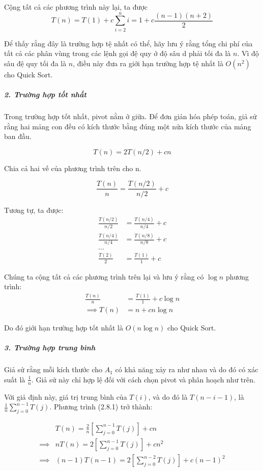 Cộng tất cả các phương trình này lại, ta được 
$$T(n) = T(1) + c \sum_{i = 2}^{n}i = 1 + c \frac{(n - 1)(n + 2)}{2}$$

Để thấy rằng đây là trường hợp tệ nhất có thể, hãy lưu ý rằng tổng chi phí của tất cả các phân vùng trong các lệnh gọi đệ quy ở độ sâu d phải tối đa là $n$. Vì độ sâu đệ quy tối đa là $n$, điều này đưa ra giới hạn trường hợp tệ nhất là $O(n^2)$ cho Quick Sort.

\subparagraph{2. Trường hợp tốt nhất}

Trong trường hợp tốt nhất, pivot nằm ở giữa. Để đơn giản hóa phép toán, giả sử rằng hai mảng con đều có kích thước bằng đúng một nửa kích thước của mảng ban đầu.

$$T(n) = 2T(n / 2) + cn$$

Chia cả hai vế của phương trình trên cho n. 

$$\frac{T(n)}{n} = \frac{T(n / 2)}{n / 2} + c$$

Tương tự, ta được:
\begin{align*}
    \frac{T(n/2)}{n/2} &= \frac{T(n / 4)}{n / 4} + c \\
    \frac{T(n/4)}{n/4} &= \frac{T(n / 8)}{n / 8} + c \\
    \dots \\
    \frac{T(2)}{2} &= \frac{T(1)}{1} + c
\end{align*}

Chúng ta cộng tất cả các phương trình trên lại và lưu ý rằng có $\log{n}$ phương trình:
\begin{align*}
    \frac{T(n)}{n} &= \frac{T(1)}{1} + c \log{n} \\
    \implies T(n) &= n + cn\log{n} 
\end{align*}

Do đó giới hạn trường hợp tốt nhất là $O(n\log{n})$ cho Quick Sort.

\subparagraph{3. Trường hợp trung bình}

Giả sử rằng mỗi kích thước cho $A_1$ có khả năng xảy ra như nhau và do đó có xác suất là $\frac{1}{n}$. Giả sử này chỉ hợp lệ đối với cách chọn pivot và phân hoạch như trên. 

Với giả định này, giá trị trung bình của $T(i)$, và do đó là $T(n - i - 1)$, là $\frac{1}{n} \sum_{j = 0}^{n - 1}T(j)$. Phương trình  (2.8.1) trở thành: 

\begin{align*}
    & T(n) = \frac{2}{n} \left[\sum_{j = 0}^{n - 1}T(j) \right] + cn \\
    \implies  &nT(n) = 2 \left[\sum_{j = 0}^{n - 1}T(j) \right] + cn^2 \tag{2.8.2} \\
    \implies  &(n - 1)T(n - 1) = 2 \left[\sum_{j = 0}^{n - 2}T(j) \right] + c(n - 1)^2 \tag{2.8.3}
\end{align*}

